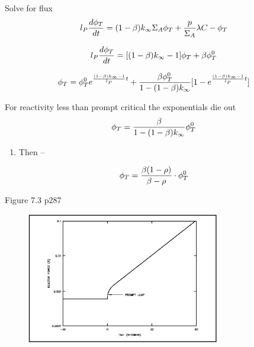 \documentclass[aspectratio=1610,pdftex,dvipsnames,compress,xcolor={dvipsnames}]{beamer}
\begin{document}
\begin{frame}{Solve for flux}
    \begin{equation}
        \LARGE
        l_P \frac{d\phi_T}{dt} =(1-\beta) k_\infty \Sigma_A \phi_T + \frac{p}{\Sigma_A} \lambda C - \phi_T
    \end{equation}

    \begin{equation}
        \LARGE
        l_P \frac{d\phi_T}{dt} = [(1-\beta)k_\infty-1] \phi_T + \beta \phi_T^0
    \end{equation}

    \begin{equation}
        \LARGE
        \phi_T = \phi_T^0 e^{\frac{(1-\beta) k_\infty-1} {l_P}t} + \frac{\beta \phi_T^0}{1 - (1-\beta) k_\infty}[1 - e^{\frac{(1-\beta) k_\infty - 1} {l_P}t}]
    \end{equation}
\end{frame}


\begin{frame}{For reactivity less than prompt critical the exponentials die out}
    \begin{equation}
        \LARGE
        \phi_T = \frac{\beta}{1 - (1-\beta) k_\infty} \phi_T^0
    \end{equation}

    \vspace*{\fill}

    \begin{enumerate}[series=outerlist,topsep=0pt,itemsep=21pt,leftmargin=*,label=(\arabic*)]
        \item[]Then --
    \end{enumerate}

    \vspace*{\fill}

    \begin{equation}
        \LARGE
        \phi_T = \frac{\beta (1 - \rho)}{\beta - \rho} \cdot \phi_T^0
    \end{equation}
\end{frame}


\begin{frame}{Figure 7.3 p287}
    \begin{figure}
        \centering
        \includegraphics[width=0.75\textwidth]{prompt.jump.jpg}
    \end{figure}
\end{frame}
\end{document}
